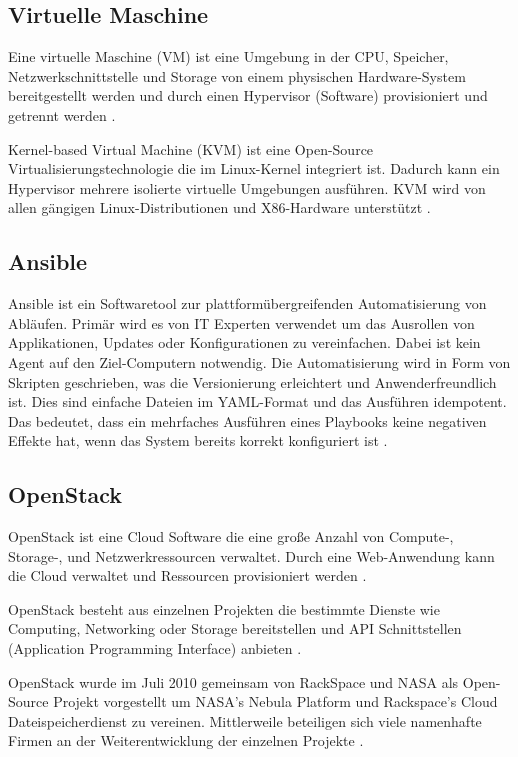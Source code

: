 \documentclass[../Main.tex]{subfiles}
\begin{document}
\subsection{Virtuelle Maschine}

Eine virtuelle Maschine (VM) ist eine Umgebung in der CPU, Speicher, Netzwerkschnittstelle und Storage von einem physischen
Hardware-System bereitgestellt werden und durch einen Hypervisor (Software) provisioniert und getrennt werden \citep{VirtuelleMaschine}.

Kernel-based Virtual Machine (KVM) ist eine Open-Source Virtualisierungstechnologie die im Linux-Kernel integriert ist. Dadurch kann ein Hypervisor mehrere isolierte
virtuelle Umgebungen ausführen. KVM wird von allen gängigen Linux-Distributionen und X86-Hardware unterstützt \citep{KVM}.

\subsection{Ansible}

Ansible ist ein Softwaretool zur plattformübergreifenden Automatisierung von Abläufen.
Primär wird es von IT Experten verwendet um das Ausrollen von Applikationen, Updates oder Konfigurationen zu vereinfachen. Dabei ist
kein Agent auf den Ziel-Computern notwendig.
Die Automatisierung wird in Form von Skripten geschrieben, was die Versionierung erleichtert und Anwenderfreundlich ist. Dies sind einfache Dateien im YAML-Format und das Ausführen idempotent.
Das bedeutet, dass ein mehrfaches Ausführen eines Playbooks keine negativen Effekte hat, wenn das System bereits korrekt konfiguriert ist \citep{Ansible}.

\subsection{OpenStack}

OpenStack ist eine Cloud Software die eine gro{\ss}e Anzahl von Compute-, Storage-, und Netzwerkressourcen
verwaltet. Durch eine Web-Anwendung kann die Cloud verwaltet und Ressourcen provisioniert werden \citep{OpenStack}.

OpenStack besteht aus einzelnen Projekten die bestimmte Dienste wie Computing, Networking oder Storage bereitstellen und
API Schnittstellen (Application Programming Interface) anbieten \citep{OpenstackComponents}.

OpenStack wurde im Juli 2010 gemeinsam von RackSpace und NASA als Open-Source Projekt vorgestellt um NASA's Nebula Platform und Rackspace's Cloud Dateispeicherdienst zu vereinen. Mittlerweile beteiligen sich viele
namenhafte Firmen an der Weiterentwicklung der einzelnen Projekte \citep{WhatIsOpenStack}.
\end{document}
